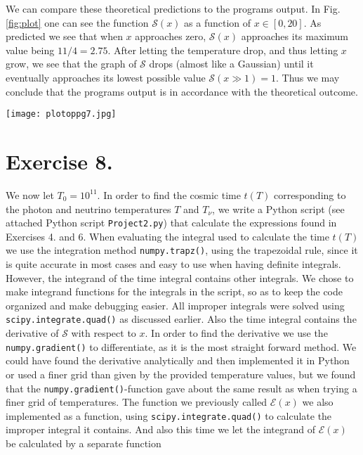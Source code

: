 \documentclass{emulateapj}
\begin{document}
	 We can compare these theoretical predictions to the programs output. In Fig. \ref{fig:plot} one can see the function $\mathcal{S}(x)$ as a function of $x\in[0,20]$. As predicted we see that when $x$ approaches zero, $\mathcal{S}(x)$ approaches its maximum value being $11/4 = 2.75$. After letting the temperature drop, and thus letting $x$ grow, we see that the graph of $\mathcal{S}$ drops (almost like a Gaussian) until it eventually approaches its lowest possible value $\mathcal{S}(x\gg1) = 1$. Thus we may conclude that the programs output is in accordance with the theoretical outcome. 
	 
	 \begin{figure*}
	 	\texttt{[image: plotoppg7.jpg]}
	 	\caption{The figure show $\mathcal{S}(x)$ as a function of $x=m_ec^2/k_BT$. It starts of at $\mathcal{S}(0) = 11/4 = 2.75$ and gradually drops of until $\mathcal{S}\to1$.}
	 	\label{fig:plot}
	 \end{figure*}
	 
 	\section*{Exercise 8.}
	We now let $T_0 = 10^{11}$. In order to find the cosmic time $t(T)$ corresponding to the photon and neutrino temperatures $T$ and $T_\nu$, we write a Python script (see attached Python script \texttt{Project2.py}) that calculate the expressions found in Exercises 4. and 6. 
	When evaluating the integral used to calculate the time $t(T)$ we use the integration method \texttt{numpy.trapz()}, using the trapezoidal rule, since it is quite accurate in most cases and easy to use when having definite integrals. However, the integrand of the time integral contains other integrals. We chose to make integrand functions for the integrals in the script, so as to keep the code organized and make debugging easier. All improper integrals were solved using \texttt{scipy.integrate.quad()} as discussed earlier. Also the time integral contains the derivative of $\mathcal{S}$ with respect to $x$. In order to find the derivative we use the \texttt{numpy.gradient()} to differentiate, as it is the most straight forward method. We could have found the derivative analytically and then implemented it in Python or used a finer grid than given by the provided temperature values, but we found that the \texttt{numpy.gradient()}-function gave about the same result as when trying a finer grid of temperatures. The function we previously called $\mathcal{E}(x)$ we also implemented as a function, using \texttt{scipy.integrate.quad()} to calculate the improper integral it contains. And also this time we let the integrand of $\mathcal{E}(x)$ be calculated by a separate function
	
\end{document}
